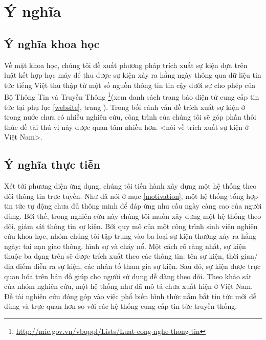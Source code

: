 \section{Ý nghĩa}
    \label{meaning}
    \subsection{Ý nghĩa khoa học}

\noindent Về mặt khoa học, chúng tôi đề xuất phương pháp trích xuất sự kiện dựa trên luật kết hợp học máy để thu được sự kiện xảy ra hằng ngày thông qua  dữ liệu tin tức tiếng Việt thu thập từ một số nguồn thông tin tin cậy dưới sự cho phép của Bộ Thông Tin và Truyền Thông \footnote{\href{http://mic.gov.vn/vbqppl/Lists/Vn$\%$20bn$\%$20QPPL/DispForm.aspx?ID=6988}{http://mic.gov.vn/vbqppl/Lists/Luat-cong-nghe-thong-tin}}(xem danh sách trang báo điện tử cung cấp tin tức tại  phụ lục \ref{website}, trang \pageref{website}). Trong bối cảnh vấn đề trích xuất sự kiện ở trong nước chưa có nhiều nghiên cứu, công trình của chúng tôi sẽ góp phần thôi thúc đề tài thú vị này được quan tâm nhiều hơn.
<nói về trích xuất sự kiện ở Việt Nam>.
    \subsection{Ý nghĩa thực tiễn}

\noindent Xét tới  phương diện  ứng dụng, chúng tôi tiến hành xây dựng một hệ thống theo dõi thông tin trực tuyến. Như đã nói ở mục \ref{motivation}, một hệ thống tổng hợp tin tức tự động chưa đủ thông minh để đáp ứng nhu cầu ngày càng cao của người dùng. Bởi thế, trong nghiên cứu này chúng tôi muốn xây dựng một hệ thống theo dõi, giám sát thông tin sự kiện. Bởi quy mô của một công trình sinh viên nghiên cứu khoa học, nhóm chúng tôi tập trung vào ba loại sự kiện thường xảy ra hằng ngày: tai nạn giao thông, hình sự và cháy nổ. Một cách rõ ràng nhất, sự kiện thuộc ba dạng trên sẽ được trích xuất theo các thông tin: tên sự kiện, thời gian/địa điểm diễn ra sự kiện, các nhân tố tham gia sự kiện. Sau đó, sự kiện được trực quan hóa trên  bản đồ giúp cho người sử dụng dễ dàng theo dõi. Theo khảo sát của nhóm nghiên cứu, một hệ thống như đã mô tả chưa xuất hiện ở Việt Nam. Đề tài nghiên cứu đóng góp vào việc phổ biến hình thức nắm bắt tin tức mới dễ dùng và trực quan hơn so với các hệ thống cung cấp tin tức truyền thống.


